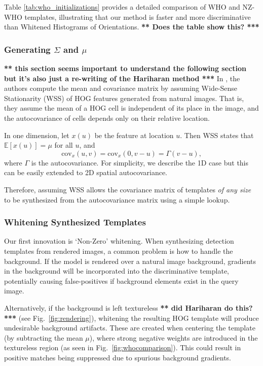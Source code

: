 \documentclass[10pt,twocolumn,letterpaper]{article}
\newcommand{\scream}[1]{{\color{red} \bf *** #1 ***}}
\begin{document}
Table \ref{tab:who_initializations} provides a detailed comparison of WHO and NZ-WHO templates, illustrating that our method is faster and more discriminative than Whitened Histograms of Orientations. \scream{Does the table show this?}

\subsubsection{Generating $\Sigma$ and $\mu$}
\scream{this section seems important to understand the following section but it's also just a re-writing of the Hariharan method}
In \cite{Hariharan12}, the authors compute the mean and covariance matrix by assuming Wide-Sense Stationarity (WSS) of HOG features
generated from natural images. That is, they assume the mean of a HOG cell is
independent of its place in the image, and the autocovariance of cells depends
only on their relative location.

In one dimension, let $x(u)$ be the feature at location $u$. Then WSS states
that $\mathbb{E}\left[x(u)\right] = \mu$ for all $u$, and
\begin{equation}
\textrm{cov}_x(u,v) = \textrm{cov}_x(0, v-u) = \Gamma(v-u),
\end{equation} where $\Gamma$ is the autocovariance. For simplicity, we describe the 1D case but this can be easily extended to 2D spatial autocovariance.

Therefore, assuming WSS allows the covariance matrix of templates \emph{of any size} to be synthesized from the autocovariance matrix using a simple lookup.

\subsubsection{Whitening Synthesized Templates}
Our first innovation is `Non-Zero' whitening. When synthesizing detection templates from rendered images, a common problem is how to handle the background. If the model is rendered over a natural image background, gradients in the background will be incorporated into the discriminative template, potentially causing false-positives if background elements exist in the query image.

Alternatively, if the background is left textureless \scream{did Hariharan do this?} (see Fig.~\ref{fig:rendering}), whitening the resulting HOG template will produce undesirable background artifacts. These are created when centering the template (by subtracting the mean $\mu$), where strong negative weights are introduced in the textureless region (as seen in Fig.~\ref{fig:whocomparison}). This could result in positive matches being suppressed due to spurious background gradients.
\end{document}
